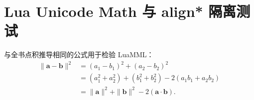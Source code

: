 \documentclass[11pt,a4paper,UTF8]{ctexart}
\newcommand{\vect}[1]{\boldsymbol{#1}}
\begin{document}
\section{Lua Unicode Math 与 align* 隔离测试}
与全书点积推导相同的公式用于检验 LuaMML：
\begin{align*}
\|\vect a-\vect b\|^2
&=(a_1-b_1)^2+(a_2-b_2)^2\\
&=(a_1^2+a_2^2)+(b_1^2+b_2^2)
-2(a_1b_1+a_2b_2)\\
&=\|\vect a\|^2+\|\vect b\|^2
-2(\vect a\cdot\vect b).
\end{align*}
\end{document}
